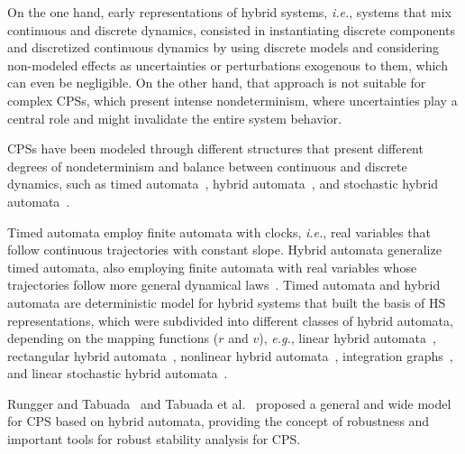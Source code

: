 \documentclass[format=acmsmall, review=false, screen=true]{acmart}
\begin{document}
On the one hand, early representations of hybrid systems, {\it i.e.}, systems that mix continuous and discrete dynamics, consisted in instantiating discrete components and discretized continuous dynamics by using discrete models and considering non-modeled effects as uncertainties or perturbations exogenous to them, which can even be negligible. On the other hand, that approach is not suitable for complex CPSs, which present intense nondeterminism, where uncertainties play a central role and might invalidate the entire system behavior.

CPSs have been modeled through different structures that present different degrees of nondeterminism and balance between continuous and discrete dynamics, such as timed automata~\cite{Alur94}, hybrid automata~\cite{Alur93,Henzinger95}, and stochastic hybrid automata~\cite{Julius09,Ghosh05,Pola03}.

Timed automata employ finite automata with clocks, {\it i.e.}, real variables that follow continuous trajectories with constant slope. Hybrid automata generalize timed automata, also employing finite automata with real variables whose trajectories follow more general dynamical laws~\cite{Henzinger95}.  Timed automata and hybrid automata are deterministic model for hybrid systems that built the basis of HS representations, which were subdivided into different classes of hybrid automata, depending on the mapping functions ($r$ and $v$), {\it e.g.}, linear hybrid automata~\cite{Lafferriere99}, rectangular hybrid automata~\cite{Puri94,Henzinger95}, nonlinear hybrid automata~\cite{Henzinger95NL,Broucke1997}, integration graphs~\cite{Kesten1993}, and linear stochastic hybrid automata~\cite{Julius09}. 


Rungger and Tabuada~\cite{Rungger16} and Tabuada et al.~\cite{Tabuada14} proposed a general and wide model for CPS based on hybrid automata, providing the concept of robustness and important tools for robust stability analysis for CPS.




\end{document}
